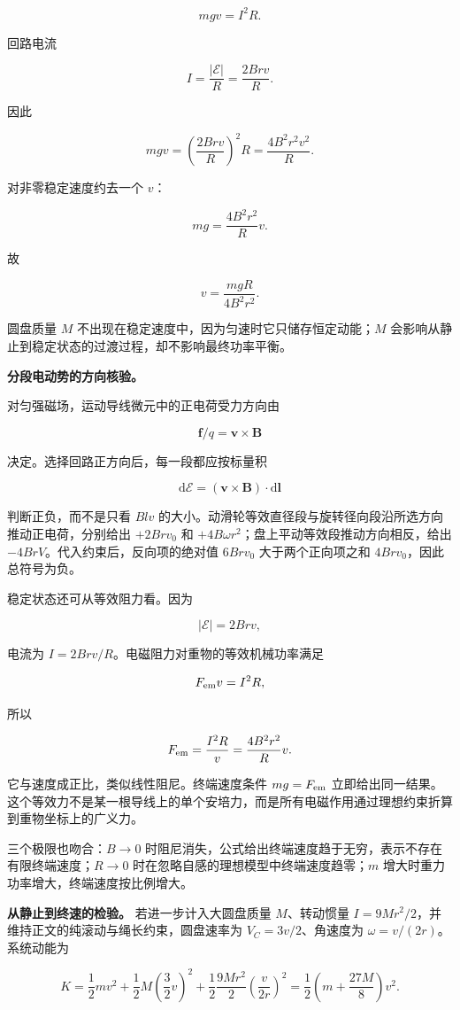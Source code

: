 \documentclass[12pt,a4paper,UTF8]{ctexart}
\begin{document}
\[mgv=I^2R.\]

回路电流

\[I=\frac{|\mathcal E|}{R}=\frac{2Brv}{R}.\]

因此

\[mgv=\left(\frac{2Brv}{R}\right)^2R
=\frac{4B^2r^2v^2}{R}.\]

对非零稳定速度约去一个 \(v\)：

\[mg=\frac{4B^2r^2}{R}v.\]

故

\[\boxed{v=\frac{mgR}{4B^2r^2}}.\]

圆盘质量 \(M\) 不出现在稳定速度中，因为匀速时它只储存恒定动能；\(M\)
会影响从静止到稳定状态的过渡过程，却不影响最终功率平衡。

\textbf{分段电动势的方向核验。}

对匀强磁场，运动导线微元中的正电荷受力方向由

\[\bm f/q=\bm v\times\bm B\]

决定。选择回路正方向后，每一段都应按标量积

\[\mathrm d\mathcal E=(\bm v\times\bm B)\cdot\mathrm d\bm l\]

判断正负，而不是只看 \(Blv\)
的大小。动滑轮等效直径段与旋转径向段沿所选方向推动正电荷，分别给出
\(+2Brv_0\) 和 \(+4B\omega r^2\)；盘上平动等效段推动方向相反，给出
\(-4BrV\)。代入约束后，反向项的绝对值 \(6Brv_0\) 大于两个正向项之和
\(4Brv_0\)，因此总符号为负。

稳定状态还可从等效阻力看。因为

\[|\mathcal E|=2Brv,\]

电流为 \(I=2Brv/R\)。电磁阻力对重物的等效机械功率满足

\[F_{\rm em}v=I^2R,\]

所以

\[F_{\rm em}=\frac{I^2R}{v}=\frac{4B^2r^2}{R}v.\]

它与速度成正比，类似线性阻尼。终端速度条件 \(mg=F_{\rm em}\)
立即给出同一结果。这个等效力不是某一根导线上的单个安培力，而是所有电磁作用通过理想约束折算到重物坐标上的广义力。

三个极限也吻合：\(B\to0\)
时阻尼消失，公式给出终端速度趋于无穷，表示不存在有限终端速度；\(R\to0\)
时在忽略自感的理想模型中终端速度趋零；\(m\)
增大时重力功率增大，终端速度按比例增大。

\textbf{从静止到终速的检验。} 若进一步计入大圆盘质量 \(M\)、转动惯量
\(I=9Mr^2/2\)，并维持正文的纯滚动与绳长约束，圆盘速率为
\(V_C=3v/2\)、角速度为 \(\omega=v/(2r)\)。系统动能为

\[K=\frac12mv^2+\frac12M\left(\frac32v\right)^2+\frac12\frac{9Mr^2}{2}\left(\frac{v}{2r}\right)^2=\frac12\left(m+\frac{27M}{8}\right)v^2.\]
\end{document}

